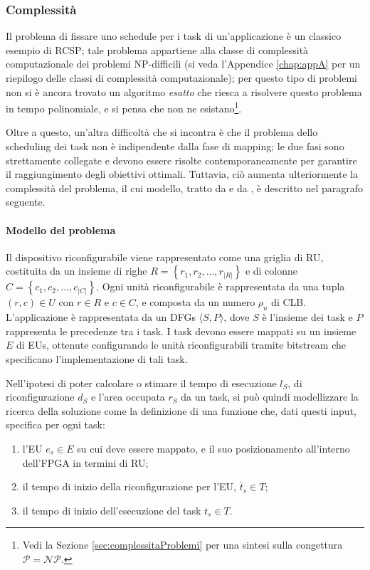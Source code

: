 \subsubsection{Complessità}
Il problema di fissare uno schedule per i task di un'applicazione è un classico esempio 
di \ac{RCSP}; tale problema appartiene alla classe di complessità computazionale dei 
problemi NP-difficili (si veda l'Appendice \ref{chap:appA} per un riepilogo delle classi 
di complessità computazionale); per questo tipo di problemi non si è ancora trovato un 
algoritmo \emph{esatto} che riesca a risolvere questo problema in tempo 
polinomiale, e si pensa che non ne esistano\footnote{Vedi la Sezione 
\ref{sec:complessitaProblemi} per una sintesi sulla congettura $\mathcal{P} = 
\mathcal{NP}$.}.

Oltre a questo, un'altra difficoltà che si incontra è che il problema dello scheduling 
dei task non è indipendente dalla fase di mapping; le due fasi sono strettamente 
collegate e devono essere risolte contemporaneamente per garantire il raggiungimento 
degli obiettivi ottimali. Tuttavia, ciò aumenta ulteriormente la complessità del 
problema, il cui modello, tratto da \cite{ModelloRedaelli} e da 
\cite{ReconfigurableSystemDesignVerification}, è descritto nel paragrafo seguente.


\paragraph{Modello del problema}
Il dispositivo riconfigurabile viene rappresentato come una griglia di \ac{RU}, 
costituita da un insieme di righe $R=\left\{r_1, r_2, \dots, r_{\vert R \vert}\right\}$ e 
di colonne $C=\left\{c_1, c_2, \dots, c_{\vert C \vert}\right\}$. Ogni unità 
riconfigurabile è rappresentata da una tupla $(r,c) \in U$ con $r \in R$ e $c \in C$, e 
composta da un numero $\rho_{u}$ di \ac{CLB}. L'applicazione è rappresentata da un 
\acp{DFG} $\langle S, P \rangle$, dove $S$ è l'insieme dei task e $P$ rappresenta le 
precedenze tra i task. I task devono essere mappati su un insieme $E$ di \acp{EU}, 
ottenute configurando le unità riconfigurabili tramite bitstream che specificano 
l'implementazione di tali task.

Nell'ipotesi di poter calcolare o stimare il tempo di esecuzione $l_{S}$, di 
riconfigurazione $d_{S}$ e l'area occupata $r_{S}$ da un task, si può quindi modellizzare 
la ricerca della soluzione come la definizione di una funzione 
che, dati questi input, specifica per ogni task:
\begin{enumerate}
 \item l'\ac{EU} $e_s \in E$ su cui deve essere mappato, e il suo posizionamento 
all'interno dell'\ac{FPGA} in termini di \ac{RU};
 \item il tempo di inizio della riconfigurazione per l'\ac{EU}, $\bar{t}_s \in T$;
 \item il tempo di inizio dell'esecuzione del task $t_s \in T$.
\end{enumerate}

